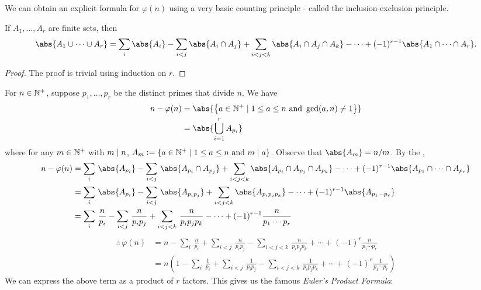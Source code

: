 We can obtain an explicit formula for $\varphi(n)$ using a very basic counting principle - called the inclusion-exclusion principle.
\begin{theorem} \label{thm:inc-exc}
    If $A_1, \ldots, A_r$ are finite sets, then
    \[
        \abs{A_1 \cup \cdots \cup A_r} = \sum_i \abs{A_i} - \sum_{i<j} \abs{A_i \cap A_j} + \sum_{i < j < k} \abs{A_i \cap A_j \cap A_k} - \cdots + (-1)^{r-1} \abs{A_1 \cap \cdots \cap A_r}.
    \]
\end{theorem}
\begin{proof}
    The proof is trivial using induction on $r$.
\end{proof}
For $n \in \mathbb{N}^+$, suppose $p_1, \ldots, p_r$ be the distinct primes that divide $n$. We have
\begin{align*}
    n - \varphi(n) &= \abs{\left\{ a \in \N^+ \mid 1 \leq a \leq n \text{ and } \gcd(a,n) \neq 1 \right\}} \\
    &= \abs{\bigcup_{i=1}^r A_{p_i}}
\end{align*}
where for any $m \in \mathbb{N}^+$ with $m \mid n$, $A_m \vcentcolon= \left\{ a \in \mathbb{N}^+ \mid 1 \leq a \leq n \text{ and } m \mid a \right\}$. Observe that $\abs{A_m} = n/m$. By the ,
\begin{align*}
    n- \varphi(n) &= \sum_i \, \abs{A_{p_i}} - \sum_{i<j} \, \abs{A_{p_i} \cap A_{p_j}} + \sum_{i < j < k} \abs{A_{p_i} \cap A_{p_j} \cap A_{p_k}} - \cdots + (-1)^{r-1} \abs{A_{p_1} \cap \cdots \cap A_{p_r}} \\
    &= \sum_i \, \abs{A_{p_i}} - \sum_{i<j} \, \abs{A_{p_ip_j}} + \sum_{i < j < k} \abs{A_{p_ip_jp_k}} - \cdots + (-1)^{r-1} \abs{A_{p_1 \cdots p_r}} \\
    &= \sum_{i} \, \frac{n}{p_i} - \sum_{i < j} \, \frac{n}{p_ip_j} + \sum_{i < j < k} \, \frac{n}{p_ip_jp_k} - \cdots + (-1)^{r-1} \frac{n}{p_1\cdots p_r}
\end{align*}
\begin{align*}
    \therefore \, \varphi(n) &= n - \sum_{i} \, \frac{n}{p_i} + \sum_{i < j} \, \frac{n}{p_ip_j} - \sum_{i < j < k} \, \frac{n}{p_ip_jp_k} + \cdots + (-1)^{r} \frac{n}{p_1\cdots p_r} \\
    &= n \left( 1 - \sum_{i} \, \frac{1}{p_i} + \sum_{i < j} \, \frac{1}{p_ip_j} - \sum_{i < j < k} \, \frac{1}{p_ip_jp_k} + \cdots + (-1)^{r} \frac{1}{p_1\cdots p_r} \right)
\end{align*}
We can express the above term as a product of $r$ factors. This gives us the famous \emph{Euler's Product Formula}:
